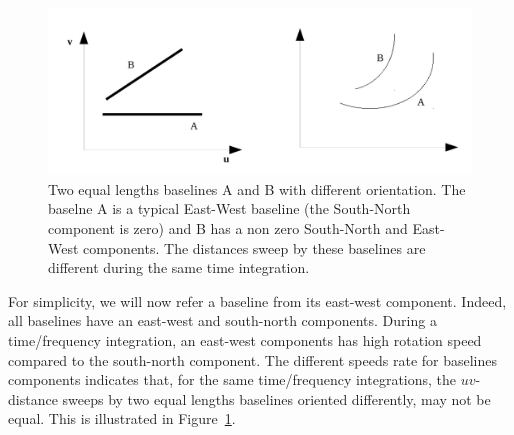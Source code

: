 \documentclass[useAMS,usenatbib]{mn2e}
\begin{document}
\begin{figure}
\includegraphics[width=.9\textwidth]{./Figures/bda_east_west_two.pdf}
\caption{Two equal lengths baselines A and B with different orientation. The baselne A is a typical
East-West baseline (the South-North component is zero) and B has a non zero South-North and East-West components.
The distances sweep by these baselines
are different during the same time integration.}\label{fig:east_west}
\end{figure}

For simplicity,  we will now refer a baseline from its east-west component. Indeed, all 
baselines have an east-west  and south-north components. During a time/frequency integration, an east-west components has high
rotation speed  compared to the south-north component. The different speeds rate for baselines components indicates that, 
for the same time/frequency integrations, the $uv$-distance sweeps by two equal lengths baselines
oriented differently, may not be equal. This is illustrated
in Figure~\ref{fig:east_west}.
\end{document}
